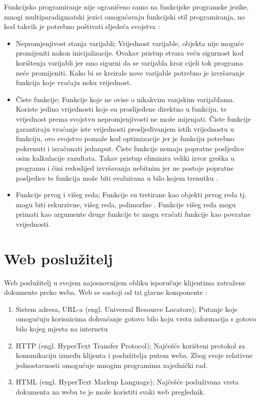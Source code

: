 \documentclass[]{foi} %
\begin{document}
Funkcijsko programiranje nije ograničeno samo na funkcijske programske jezike,
mnogi multiparadigmatski jezici omogućavaju funkcijski stil programiranja, no kod takvih je
potrebno poštivati sljedeća svojstva \cite{rovzic2016lambda}:
\begin{itemize}
	\item Nepromjenjivost stanja varijabli; Vrijednost varijable, objekta nije moguće promijeniti
	      nakon inicijalizacije. Ovakav pristup stvara veću sigurnost kod korištenja varijabli jer
	      smo sigurni da se varijabla kroz cijeli tok programa neće promijeniti. Kako bi se kreirale
	      nove varijable potrebno je izvršavanje funkcija koje vraćaju neku vrijednost.
	\item Čiste funkcije; Funkcije koje ne ovise o nikakvim vanjskim varijablama. Koriste jedino vrijednosti
	      koje su proslijeđene direktno u funkciju, te vrijednost prema svojstvu nepromjenjivosti ne može mijenjati.
	      Čiste funkcije garantiraju vraćanje iste vrijednosti prosljeđivanjem istih vrijednostu u funkciju,
	      ovo svojstvo pomaže kod optimizacije jer je funkciju potrebno pokrenuti i izračunati jedanput.
	      Čiste funkcije nemaju popratne posljedice osim kalkulacije razultata. Takav pristup eliminira
	      veliki izvor greška u programu i čini redoslijed izvršavanja nebitnim jer ne postoje popratne
	      posljedice te funkcija može biti evaluirana u bilo kojem trenutku \cite{hughes1989functional}.
	\item Funkcije prvog i višeg reda; Funkcije su tretirane kao objekti prvog reda tj. mogu biti rekurzivne,
	      višeg reda, polimorfne \cite{10.1145/72551.72554}. Funkcije višeg reda mogu primati kao argumente
	      druge funkcije te mogu vraćati funkcije kao povratne vrijednosti.
\end{itemize}

\chapter{Web poslužitelj}

Web poslužitelj u svojem najosnovnijem obliku isporučuje klijentima zatražene dokumente preko weba.
Web se sastoji od tri glavne komponente \cite{yeager1996web}:
\begin{enumerate}
	\item Sistem adresa, URL-a (engl. Universal Resource Locators); Putanje koje omogućuju korisnicima
	      dohvaćanje gotovo bilo koju vrstu informacija s gotovo bilo kojeg mjesta na internetu
	\item HTTP (engl. HyperText Transfer Protocol); Najčešće korišteni protokol za komunikaciju između
	      klijenta i poslužitelja putem weba. Zbog svoje relativne jednostavnosti omogućuje mnogim programima
	      zajednički rad.
	\item HTML (engl. HyperText Markup Language); Najčešće posluživana vrsta dokumenta na webu te je može
	      koristiti svaki web preglednik.
\end{enumerate}
\end{document}
